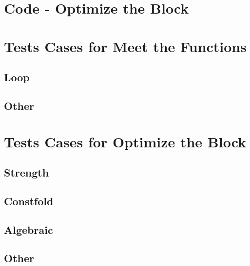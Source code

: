 \section{Code - Optimize the Block}

{\tiny }

\section{Tests Cases for Meet the Functions}

\subsection{Loop}

{\tiny }

\subsection{Other}

{\tiny }

\section{Tests Cases for Optimize the Block}

\subsection{Strength}

{\tiny }

\subsection{Constfold}

{\tiny }

\subsection{Algebraic}

{\tiny }

\subsection{Other}

{\tiny }

